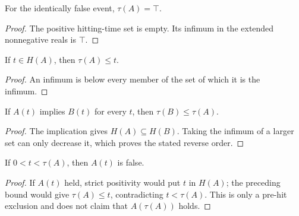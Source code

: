 \begin{theorem}
\label{thm:hitting:empty}
For the identically false event, $\tau(A)=\top$.
\end{theorem}
\begin{proof}

\leanok
The positive hitting-time set is empty.  Its infimum in the extended
nonnegative reals is $\top$.
\end{proof}

\begin{theorem}
\label{thm:hitting:le-of-mem}
If $t\in H(A)$, then $\tau(A)\leq t$.
\end{theorem}
\begin{proof}

\leanok
An infimum is below every member of the set of which it is the infimum.
\end{proof}

\begin{theorem}
\label{thm:hitting:mono}
If $A(t)$ implies $B(t)$ for every $t$, then $\tau(B)\leq\tau(A)$.
\end{theorem}
\begin{proof}

\leanok
The implication gives $H(A)\subseteq H(B)$.  Taking the infimum of a larger
set can only decrease it, which proves the stated reverse order.
\end{proof}

\begin{theorem}
\label{thm:hitting:not-event-before}
If $0<t<\tau(A)$, then $A(t)$ is false.
\end{theorem}
\begin{proof}

\leanok
If $A(t)$ held, strict positivity would put $t$ in $H(A)$; the preceding
bound would give $\tau(A)\leq t$, contradicting $t<\tau(A)$.  This is only a
pre-hit exclusion and does not claim that $A(\tau(A))$ holds.
\end{proof}

